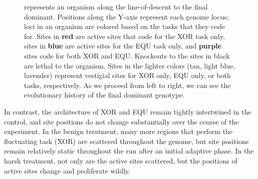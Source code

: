 \documentclass[letterpaper]{article}
\begin{document}
\begin{figure}[h!]
\begin{center}
{%
represents an organism along the line-of-descent to
the final dominant.
Positions along
the Y-axis represent each genome locus; loci in an organism are colored based on the tasks that they code for. Sites in \textbf{red} are active sites that code for the XOR task only, sites in \textbf{blue} are active sites for the EQU task only, and \textbf{purple} sites code for both XOR and EQU. Knockouts to the sites in black are lethal to the organism. Sites in the lighter colors (tan, light blue, lavender) represent vestigial sites for XOR only, EQU only, or both tasks, respectively.
As we proceed from left to right, we can see the evolutionary history of the final dominant genotype.
}\label{fig:lineage}
\end{center}
\end{figure}

In contrast, the architecture of XOR and EQU remain tightly intertwined in the control, and site positions do not change substantially %
over the course of the experiment. In the benign treatment, many more regions that perform the fluctuating task (XOR) are scattered throughout the genome, but site positions remain relatively static throughout the run after an initial adaptive phase. In the harsh treatment, not only are the active sites scattered, but the positions of active sites change and proliferate wildly.
\end{document}
